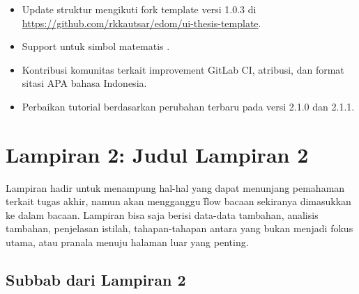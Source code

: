 \begin{itemize}
	\begin{itemize}
		\item Update struktur mengikuti fork template versi 1.0.3 di \url{https://github.com/rkkautsar/edom/ui-thesis-template}.
		\item Support untuk simbol matematis .
		\item Kontribusi komunitas terkait improvement GitLab CI, atribusi, dan format sitasi APA bahasa Indonesia.
		\item Perbaikan tutorial berdasarkan perubahan terbaru pada versi 2.1.0 dan 2.1.1.
	\end{itemize}
\end{itemize}

\chapter*{Lampiran 2: Judul Lampiran 2}
\label{appendix:sample}
Lampiran hadir untuk menampung hal-hal yang dapat menunjang pemahaman terkait tugas akhir, namun akan mengganggu \f{flow} bacaan sekiranya dimasukkan ke dalam bacaan.
Lampiran bisa saja berisi data-data tambahan, analisis tambahan, penjelasan istilah, tahapan-tahapan antara yang bukan menjadi fokus utama, atau pranala menuju halaman luar yang penting.

\section*{Subbab dari Lampiran 2}
\label{appendix:sampleSubchap}
